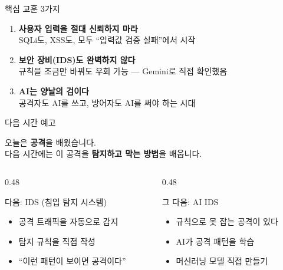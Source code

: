 \documentclass[aspectratio=169,10pt]{beamer}
\newcommand{\hlt}[1]{\textcolor{accent}{\textbf{#1}}}
\newcommand{\red}[1]{\textcolor{redTeam}{\textbf{#1}}}
\newcommand{\blue}[1]{\textcolor{blueTeam}{\textbf{#1}}}
\begin{document}
\begin{frame}{핵심 교훈 3가지}

\begin{center}
\Large
\begin{enumerate}
    \item \hlt{사용자 입력을 절대 신뢰하지 마라}\\[0.3em]
          {\normalsize SQLi도, XSS도, 모두 ``입력값 검증 실패''에서 시작}

    \vspace{0.5em}
    \item \hlt{보안 장비(IDS)도 완벽하지 않다}\\[0.3em]
          {\normalsize 규칙을 조금만 바꿔도 우회 가능 — Gemini로 직접 확인했음}

    \vspace{0.5em}
    \item \hlt{AI는 양날의 검이다}\\[0.3em]
          {\normalsize 공격자도 AI를 쓰고, 방어자도 AI를 써야 하는 시대}
\end{enumerate}
\end{center}
\end{frame}

\begin{frame}{다음 시간 예고}
\begin{center}
\Large
오늘은 \red{공격}을 배웠습니다.\\[0.5em]
다음 시간에는 이 공격을 \blue{탐지하고 막는 방법}을 배웁니다.
\end{center}

\vspace{1em}
\begin{columns}[T]
\begin{column}{0.48\textwidth}
\begin{block}{다음: IDS (침입 탐지 시스템)}
\begin{itemize}
    \item 공격 트래픽을 자동으로 감지
    \item 탐지 규칙을 직접 작성
    \item ``이런 패턴이 보이면 공격이다''
\end{itemize}
\end{block}
\end{column}
\begin{column}{0.48\textwidth}
\begin{block}{그 다음: AI IDS}
\begin{itemize}
    \item 규칙으로 못 잡는 공격이 있다
    \item AI가 공격 패턴을 학습
    \item 머신러닝 모델 직접 만들기
\end{itemize}
\end{block}
\end{column}
\end{columns}
\end{frame}
\end{document}

